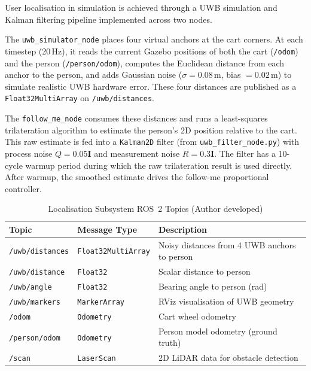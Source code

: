 User localisation in simulation is achieved through a UWB simulation 
and Kalman filtering pipeline implemented across two nodes.

The \texttt{uwb\_simulator\_node} places four virtual anchors at the 
cart corners. At each timestep (20\,Hz), it reads the current Gazebo 
positions of both the cart (\texttt{/odom}) and the person 
(\texttt{/person/odom}), computes the Euclidean distance from each 
anchor to the person, and adds Gaussian noise ($\sigma = 0.08$\,m, 
bias $= 0.02$\,m) to simulate realistic UWB hardware error. These four 
distances are published as a \texttt{Float32MultiArray} on 
\texttt{/uwb/distances}.

The \texttt{follow\_me\_node} consumes these distances and runs a 
least-squares trilateration algorithm to estimate the person's 2D 
position relative to the cart. This raw estimate is fed into a 
\texttt{Kalman2D} filter (from \texttt{uwb\_filter\_node.py}) with 
process noise $Q = 0.05\mathbf{I}$ and measurement noise 
$R = 0.3\mathbf{I}$. The filter has a 10-cycle warmup period during 
which the raw trilateration result is used directly. After warmup, 
the smoothed estimate drives the follow-me proportional controller.

\begin{table}[!ht]
\caption{Localisation Subsystem ROS~2 Topics (Author developed)}
\label{tab:localization}
\centering
\footnotesize
\begin{tabular}{p{2.0cm} p{2.2cm} p{2.4cm}}
\toprule
\textbf{Topic} & \textbf{Message Type} & \textbf{Description} \\
\midrule
\texttt{/uwb/distances} & \texttt{Float32MultiArray} & Noisy distances from 4 UWB anchors to person \\
\texttt{/uwb/distance}  & \texttt{Float32} & Scalar distance to person \\
\texttt{/uwb/angle}     & \texttt{Float32} & Bearing angle to person (rad) \\
\texttt{/uwb/markers}   & \texttt{MarkerArray} & RViz visualisation of UWB geometry \\
\texttt{/odom}          & \texttt{Odometry} & Cart wheel odometry \\
\texttt{/person/odom}   & \texttt{Odometry} & Person model odometry (ground truth) \\
\texttt{/scan}          & \texttt{LaserScan} & 2D LiDAR data for obstacle detection \\
\bottomrule
\end{tabular}
\end{table}

